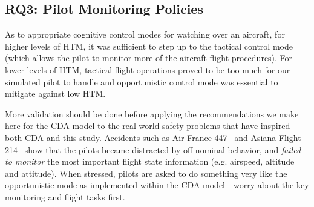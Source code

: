 \documentclass[journal]{IEEEtran}
\newenvironment{changed}{\par}{\par}
\begin{document}
\subsection{RQ3: Pilot Monitoring Policies}

As to appropriate cognitive control modes for watching over an aircraft, for higher levels of HTM, it was sufficient to step up to the tactical control mode (which allows the pilot to monitor more of the aircraft flight procedures).
For lower levels of HTM, tactical flight operations proved to be too much for our
simulated pilot to handle and opportunistic control mode was essential to mitigate against low HTM.

\begin{changed}
More validation should be done before applying the recommendations we make here for the CDA model to the real-world safety problems that have inspired both CDA and this study.
Accidents such as Air France 447~\cite{AirFranceFinal2012} and 
Asiana Flight 214~\cite{AsianaFinal2014} show that
the pilots became distracted by off-nominal behavior, and {\em failed to monitor} the most important flight state information (e.g. airspeed, altitude and attitude).
When stressed, pilots are asked to do something very like the opportunistic mode as implemented within the CDA model---worry about the key monitoring and flight tasks first.
\end{changed}



\end{document}

